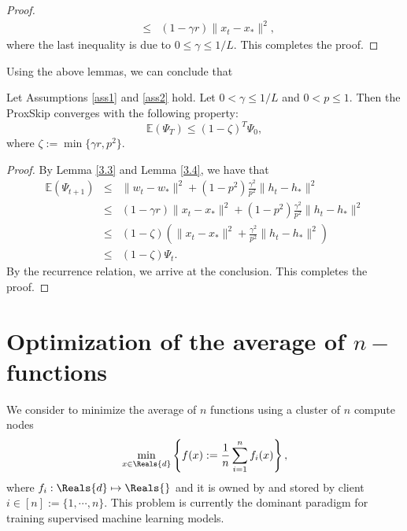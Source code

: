\begin{itemize}
\begin{proof}
\begin{eqnarray}
&\leq& (1 - \gamma r) \|x_t - x_*\|^2,  
\end{eqnarray}
where the last inequality is due to $0 \leq \gamma \leq 1/L.$ This completes the proof. 
\end{proof}
Using the above lemmas, we can conclude that 
\begin{theorem}
Let Assumptions \ref{ass1} and \ref{ass2} hold. Let $0 < \gamma \leq 1/L$ and 
$0 < p \leq 1$. Then the ProxSkip converges with the following property: 
\begin{equation} 
\mathbb{E}(\Psi_T) \leq (1 - \zeta)^T \Psi_0, 
\end{equation} 
where $\zeta:= \min\{\gamma r, p^2\}$. 
\end{theorem}
\begin{proof} 
By Lemma \ref{3.3} and Lemma \ref{3.4}, we have that 
\begin{eqnarray}
\mathbb{E}(\Psi_{t+1}) &\leq& \|w_t - w_*\|^2 + (1 - p^2) \frac{\gamma^2}{p^2} \|h_t - h_*\|^2 \\ 
&\leq& (1 - \gamma r) \|x_t - x_*\|^2 + (1 - p^2) \frac{\gamma^2}{p^2} \|h_t - h_*\|^2 \\
&\leq& (1 - \zeta) \left ( \|x_t - x_*\|^2 +  \frac{\gamma^2}{p^2} \|h_t - h_*\|^2 \right ) \\
&\leq& (1 - \zeta) \Psi_t. 
\end{eqnarray}
By the recurrence relation, we arrive at the conclusion. This completes the proof.  
\end{proof}

\newpage 

\section{Optimization of the average of $n-$functions} 

We consider to minimize the average of $n$ functions using a cluster of $n$ compute nodes
\begin{equation}
\min_{x \in \Reals{d}} \left \{ f(x) := \frac{1}{n} \sum_{i=1}^n f_i(x) \right \}, 
\end{equation}
where $f_i : \Reals{d} \mapsto \Reals{}$ and it is owned by and stored by client $i \in [n] := \{1,\cdots,n\}.$ This problem is currently the dominant paradigm for training supervised machine learning models. 


\end{itemize}
